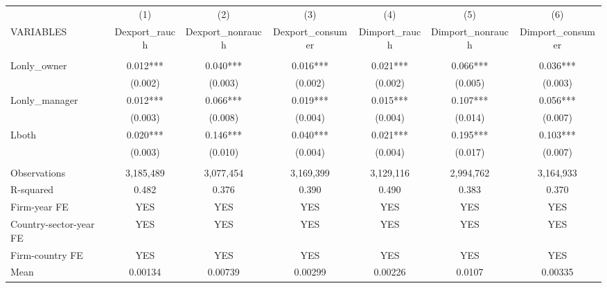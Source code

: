 \begin{tabular}{lcccccc} \hline
 & (1) & (2) & (3) & (4) & (5) & (6) \\
VARIABLES & Dexport\_rauch & Dexport\_nonrauch & Dexport\_consumer & Dimport\_rauch & Dimport\_nonrauch & Dimport\_consumer \\ \hline
 &  &  &  &  &  &  \\
Lonly\_owner & 0.012*** & 0.040*** & 0.016*** & 0.021*** & 0.066*** & 0.036*** \\
 & (0.002) & (0.003) & (0.002) & (0.002) & (0.005) & (0.003) \\
Lonly\_manager & 0.012*** & 0.066*** & 0.019*** & 0.015*** & 0.107*** & 0.056*** \\
 & (0.003) & (0.008) & (0.004) & (0.004) & (0.014) & (0.007) \\
Lboth & 0.020*** & 0.146*** & 0.040*** & 0.021*** & 0.195*** & 0.103*** \\
 & (0.003) & (0.010) & (0.004) & (0.004) & (0.017) & (0.007) \\
 &  &  &  &  &  &  \\
Observations & 3,185,489 & 3,077,454 & 3,169,399 & 3,129,116 & 2,994,762 & 3,164,933 \\
R-squared & 0.482 & 0.376 & 0.390 & 0.490 & 0.383 & 0.370 \\
Firm-year FE & YES & YES & YES & YES & YES & YES \\
Country-sector-year FE & YES & YES & YES & YES & YES & YES \\
Firm-country FE & YES & YES & YES & YES & YES & YES \\
 Mean & 0.00134 & 0.00739 & 0.00299 & 0.00226 & 0.0107 & 0.00335 \\ \hline
\end{tabular}
